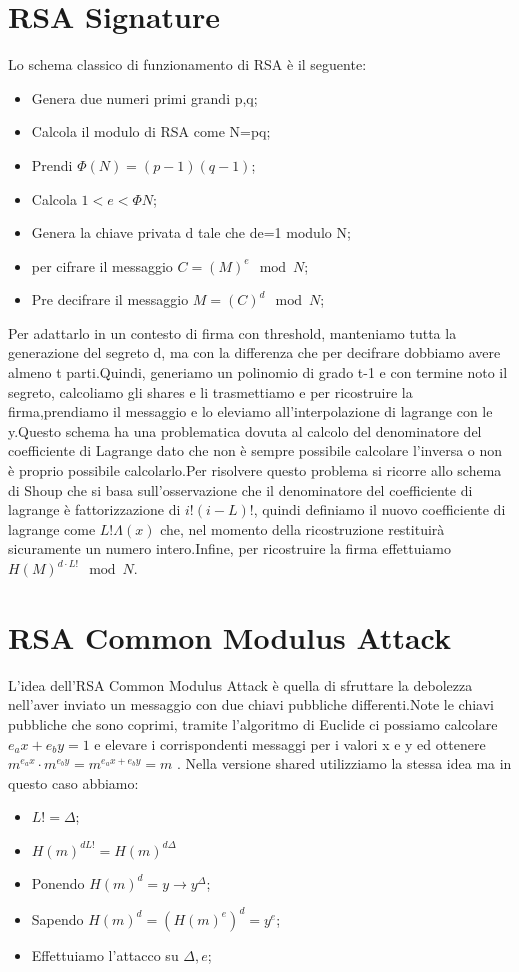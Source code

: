 \documentclass{book}
\newcommand*{\fac}{!}
\begin{document}
\section{RSA Signature}
Lo schema classico di funzionamento di RSA è il seguente:\begin{itemize}
    \item Genera due numeri primi grandi p,q;
    \item Calcola il modulo di RSA come N=pq;
    \item Prendi \(\Phi (N)=(p-1)(q-1)\);
    \item Calcola \(1<e<\Phi N\);
    \item Genera la chiave privata d tale che de=1 modulo N\@;
    \item per cifrare il messaggio \(C={(M)}^{e} \mod{N}\);
    \item Pre decifrare il messaggio \(M={(C)}^{d} \mod{N}\);
\end{itemize}
Per adattarlo in un contesto di firma con threshold, manteniamo tutta la generazione del segreto d, ma con la differenza che per decifrare dobbiamo avere almeno t parti.Quindi, generiamo un polinomio di grado t-1 e con termine noto il segreto, calcoliamo gli shares e li trasmettiamo e per ricostruire la firma,prendiamo il messaggio e lo eleviamo all'interpolazione di lagrange con le y.Questo schema ha una problematica dovuta al calcolo del denominatore del coefficiente di Lagrange dato che non è sempre possibile calcolare l'inversa o non è proprio possibile calcolarlo.Per risolvere questo problema si ricorre allo schema di Shoup che si basa sull'osservazione che il denominatore del coefficiente di lagrange è fattorizzazione di \(i\fac (i-L)\fac \), quindi definiamo il nuovo coefficiente di lagrange come \(L\fac \Lambda (x)\) che, nel momento della ricostruzione restituirà sicuramente un numero intero.Infine, per ricostruire la firma effettuiamo \({H (M)}^{d\cdot L\fac}\mod{N}\).
\section{RSA Common Modulus Attack}
L'idea dell'RSA Common Modulus Attack è quella di sfruttare la debolezza nell'aver inviato un messaggio con due chiavi pubbliche differenti.Note le chiavi pubbliche che sono coprimi, tramite l'algoritmo di Euclide ci possiamo calcolare \(e_{a}x+e_{b}y=1\) e elevare i corrispondenti messaggi per i valori x e y ed ottenere \(m^{e_{a}x}\cdot m^{e_{b}y}=m^{e_{a}x+e_{b}y}=m\) \@.\newline
Nella versione shared utilizziamo la stessa idea ma in questo caso abbiamo:\begin{itemize}
    \item \(L\fac=\Delta \);
    \item \({H(m)}^{d L\fac}={H(m)}^{d\Delta }\)
    \item Ponendo \({H(m)}^{d}=y\rightarrow y^{\Delta }\);
    \item Sapendo \({H(m)}^{d}={({H(m)}^{e})}^{d}={y}^{e}\);
    \item Effettuiamo l'attacco su \(\Delta , e\);
\end{itemize}
\end{document}

